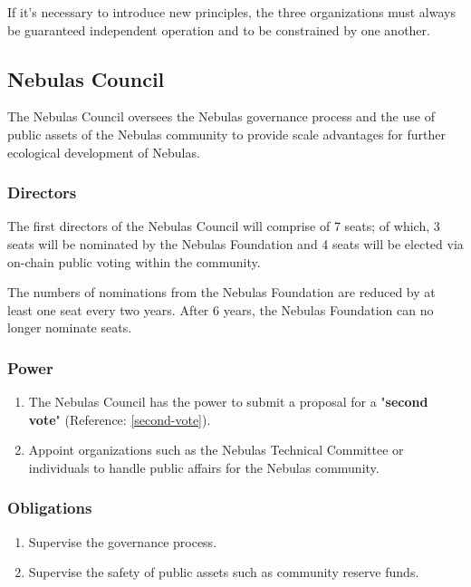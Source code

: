 If it's necessary to introduce new principles, the three organizations must always be guaranteed independent operation and to be constrained by one another.

\subsection{Nebulas Council}

The Nebulas Council oversees the Nebulas governance process and the use of public assets of the Nebulas community to provide scale advantages for further ecological development of Nebulas.

\subsubsection{Directors}

The first directors of the Nebulas Council will comprise of 7 seats; of which, 3 seats will be nominated by the Nebulas Foundation and 4 seats will be elected via on-chain public voting within the community.

The numbers of nominations from the Nebulas Foundation are reduced by at least one seat every two years. After 6 years, the Nebulas Foundation can no longer nominate seats.

\subsubsection{Power}

\begin{enumerate}
	\item The Nebulas Council has the power to submit a proposal for a "\textbf{second vote}" (Reference: \ref{second-vote}).
	\item Appoint organizations such as the Nebulas Technical Committee or individuals to handle public affairs for the Nebulas community.
\end{enumerate}

\subsubsection{Obligations}

\begin{enumerate}
	\item Supervise the governance process.
	\item Supervise the safety of public assets such as community reserve funds.
\end{enumerate}

